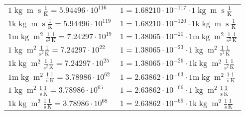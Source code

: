 \begin{center}
\begin{longtable}{l l}
{\color{black}$1 \bm{\mathrm{ }}\operatorname{kg}{\operatorname{m}}{\operatorname{s}}{}\frac1{\operatorname{K}} = 5.94496\cdot10^{116} $}   & {\color{black}$ 1 = 1.68210\cdot10^{-117} \cdot 1 \bm{\mathrm{ }}\operatorname{kg}{\operatorname{m}}{\operatorname{s}}{}\frac1{\operatorname{K}}$}  \\
{\color{gray}$1 \bm{\mathrm{ k}}\operatorname{kg}{\operatorname{m}}{\operatorname{s}}{}\frac1{\operatorname{K}} = 5.94496\cdot10^{119} $}   & {\color{gray}$ 1 = 1.68210\cdot10^{-120} \cdot 1 \bm{\mathrm{ k}}\operatorname{kg}{\operatorname{m}}{\operatorname{s}}{}\frac1{\operatorname{K}}$}  \\
{\color{gray}$1 \bm{\mathrm{ m}}\operatorname{kg}{\operatorname{m}^2}\frac1{\operatorname{s}^2}{}\frac1{\operatorname{K}} = 7.24297\cdot10^{19} $}   & {\color{gray}$ 1 = 1.38065\cdot10^{-20} \cdot 1 \bm{\mathrm{ m}}\operatorname{kg}{\operatorname{m}^2}\frac1{\operatorname{s}^2}{}\frac1{\operatorname{K}}$}  \\
{\color{black}$1 \bm{\mathrm{ }}\operatorname{kg}{\operatorname{m}^2}\frac1{\operatorname{s}^2}{}\frac1{\operatorname{K}} = 7.24297\cdot10^{22} $}   & {\color{black}$ 1 = 1.38065\cdot10^{-23} \cdot 1 \bm{\mathrm{ }}\operatorname{kg}{\operatorname{m}^2}\frac1{\operatorname{s}^2}{}\frac1{\operatorname{K}}$}  \\
{\color{gray}$1 \bm{\mathrm{ k}}\operatorname{kg}{\operatorname{m}^2}\frac1{\operatorname{s}^2}{}\frac1{\operatorname{K}} = 7.24297\cdot10^{25} $}   & {\color{gray}$ 1 = 1.38065\cdot10^{-26} \cdot 1 \bm{\mathrm{ k}}\operatorname{kg}{\operatorname{m}^2}\frac1{\operatorname{s}^2}{}\frac1{\operatorname{K}}$}  \\
{\color{gray}$1 \bm{\mathrm{ m}}\operatorname{kg}{\operatorname{m}^2}\frac1{\operatorname{s}}{}\frac1{\operatorname{K}} = 3.78986\cdot10^{62} $}   & {\color{gray}$ 1 = 2.63862\cdot10^{-63} \cdot 1 \bm{\mathrm{ m}}\operatorname{kg}{\operatorname{m}^2}\frac1{\operatorname{s}}{}\frac1{\operatorname{K}}$}  \\
{\color{black}$1 \bm{\mathrm{ }}\operatorname{kg}{\operatorname{m}^2}\frac1{\operatorname{s}}{}\frac1{\operatorname{K}} = 3.78986\cdot10^{65} $}   & {\color{black}$ 1 = 2.63862\cdot10^{-66} \cdot 1 \bm{\mathrm{ }}\operatorname{kg}{\operatorname{m}^2}\frac1{\operatorname{s}}{}\frac1{\operatorname{K}}$}  \\
{\color{gray}$1 \bm{\mathrm{ k}}\operatorname{kg}{\operatorname{m}^2}\frac1{\operatorname{s}}{}\frac1{\operatorname{K}} = 3.78986\cdot10^{68} $}   & {\color{gray}$ 1 = 2.63862\cdot10^{-69} \cdot 1 \bm{\mathrm{ k}}\operatorname{kg}{\operatorname{m}^2}\frac1{\operatorname{s}}{}\frac1{\operatorname{K}}$}  \\

\end{longtable}
\end{center}
